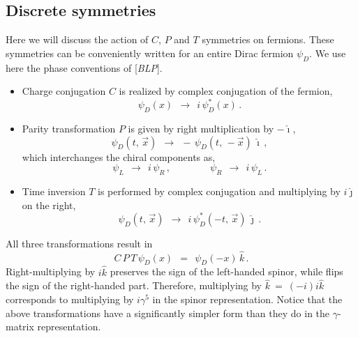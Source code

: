 \documentclass[epsfig,12pt]{article}
\newcommand{\ii}{\hat\imath}
\newcommand{\jj}{\hat\jmath}
\newcommand{\kk}{\hat k}
\begin{document}
\subsection{Discrete symmetries}
\label{section-discrete}

	Here we will discuss the action of $ C $, $ P $ and $ T $ symmetries on fermions.
	These symmetries can be conveniently written for an entire Dirac fermion $ \psi_D $.
	We use here the phase conventions of [\emph{BLP}].

\begin{itemize}

\item
	Charge conjugation $ C $ is realized by complex conjugation of the fermion,
\begin{equation}
\label{C-trans}
	\psi_D(x)	~~\to~~		i\,\psi_D^*(x)\,.
\end{equation}

\item
	Parity transformation $ P $ is given by right multiplication by $ -\ii $,
\begin{equation}
\label{P-trans}
	\psi_D(t,\, \vec x)	~~\to~~		-\,\psi_D(t,\, -\vec x)\,\ii\,,
\end{equation}
	which interchanges the chiral components as,
\begin{equation}
	\psi_L	~~\to~~		i\,\psi_R\,,
	\qquad\qquad
	\psi_R	~~\to~~		i\,\psi_L\,.
\end{equation}

\item
	Time inversion $ T $ is performed by complex conjugation and 
	multiplying by $ i\jj $ on the right,
\begin{equation}
\label{T-trans}
	\psi_D(t,\, \vec x)	~~\to~~		i\,\psi_D^*(-t,\, \vec x)\,\jj\,.
\end{equation}

\end{itemize}

	All three transformations result in
\begin{equation}
\label{CPT-trans}
	C\,P\,T\, \psi_D(x)	~~=~~		\psi_D(-x)\,\kk\,.
\end{equation}
	Right-multiplying by $ i\kk $ preserves the sign of the left-handed spinor,
	while flips the sign of the right-handed part.
	Therefore, multiplying by $ \kk ~=~ (-i)i\kk $ corresponds to multiplying
	by $ i\gamma^5 $ in the spinor representation.
	Notice that the above transformations have a significantly simpler
	form than they do in the $ \gamma $-matrix representation.
\end{document}

